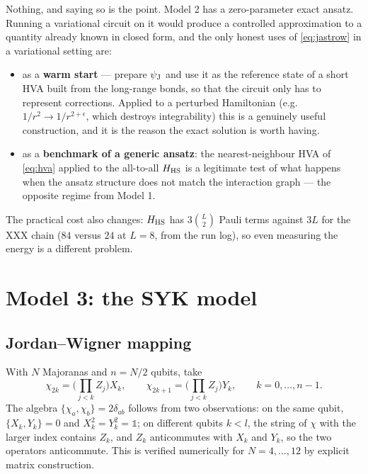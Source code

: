 \documentclass[10pt,a4paper]{article}
\begin{document}
Nothing, and saying so is the point. Model 2 has a zero-parameter exact
ansatz. Running a variational circuit on it would produce a controlled
approximation to a quantity already known in closed form, and the only honest
uses of \eqref{eq:jastrow} in a variational setting are:

\begin{itemize}\itemsep2pt
\item as a \textbf{warm start} --- prepare $\psi_{\rm J}$ and use it as the
  reference state of a short HVA built from the long-range bonds, so that the
  circuit only has to represent corrections. Applied to a perturbed
  Hamiltonian (e.g.\ $1/r^2 \to 1/r^{2+\epsilon}$, which destroys
  integrability) this is a genuinely useful construction, and it is the reason
  the exact solution is worth having.
\item as a \textbf{benchmark of a generic ansatz}: the nearest-neighbour HVA
  of \eqref{eq:hva} applied to the all-to-all $H_{\rm HS}$ is a legitimate test
  of what happens when the ansatz structure does not match the interaction
  graph --- the opposite regime from Model 1.
\end{itemize}

The practical cost also changes: $H_{\rm HS}$ has $3\binom{L}{2}$ Pauli terms
against $3L$ for the XXX chain ($84$ versus $24$ at $L=8$, from the run log),
so even measuring the energy is a different problem.

\section{Model 3: the SYK model}

\subsection{Jordan--Wigner mapping}

With $N$ Majoranas and $n = N/2$ qubits, take
\begin{equation}
  \chi_{2k} = \Big(\prod_{j<k} Z_j\Big) X_k,
  \qquad
  \chi_{2k+1} = \Big(\prod_{j<k} Z_j\Big) Y_k,
  \qquad k = 0,\dots,n-1 .
  \label{eq:jw}
\end{equation}
The algebra $\{\chi_a,\chi_b\} = 2\delta_{ab}$ follows from two observations:
on the same qubit, $\{X_k,Y_k\}=0$ and $X_k^2=Y_k^2=\mathbb{1}$; on different
qubits $k<l$, the string of $\chi$ with the larger index contains $Z_k$, and
$Z_k$ anticommutes with $X_k$ and $Y_k$, so the two operators anticommute.
This is verified numerically for $N = 4,\dots,12$ by explicit matrix
construction.
\end{document}
